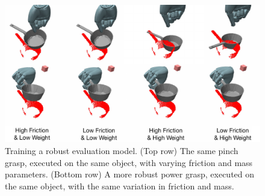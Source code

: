 \begin{figure}[t]
\includegraphics[width=\columnwidth]{images/frictionweight}
\caption{Training a robust evaluation model. (Top row) The same pinch grasp, executed on the same object, with varying friction and mass parameters. (Bottom row) A more robust power grasp, executed on the same object, with the same variation in friction and mass. \label{fig:evaluative-training}}
\end{figure}
